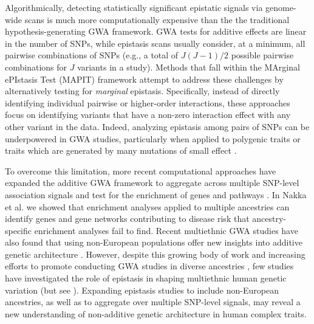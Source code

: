 \documentclass[10pt]{article}
\begin{document}
Algorithmically, detecting statistically significant epistatic signals via genome-wide scans is much more computationally expensive than the the traditional hypothesis-generating GWA framework. GWA tests for additive effects are linear in the number of SNPs, while epistasis scans usually consider, at a minimum, all pairwise combinations of SNPs (e.g., a total of $J(J - 1)/2$ possible pairwise combinations for $J$ variants in a study). Methods that fall within the MArginal ePIstasis Test (MAPIT) framework \cite{Crawford2017a,Crawford2018b,Moore2019,Wang2019} attempt to address these challenges by alternatively testing for \textit{marginal} epistasis. Specifically, instead of directly identifying individual pairwise or higher-order interactions, these approaches focus on identifying variants that have a non-zero interaction effect with any other variant in the data. Indeed, analyzing epistasis among pairs of SNPs can be underpowered in GWA studies, particularly when applied to polygenic traits or traits which are generated by many mutations of small effect \cite{Zhou2013,Yang2014,Bulik-Sullivan2015,Wray2018}. 

To overcome this limitation, more recent computational approaches have expanded the additive GWA framework to aggregate across multiple SNP-level association signals and test for the enrichment of genes and pathways \cite{Subramanian2005,Cantor2010,Wang2010b,Lee2012,Carbonetto2013,Mooney2014,Gamazon2015,de2016,Nakka2016,Zhu2018,Sun2019,Cheng2020}. In Nakka et al. \cite{Nakka2017} we showed that enrichment analyses applied to multiple ancestries can identify genes and gene networks contributing to disease risk that ancestry-specific enrichment analyses fail to find. Recent multiethnic GWA studies have also found that using non-European populations offer new insights into additive genetic architecture \cite{Martin2017b,Crawford2017b,Duncan2019,Kuchenbaecker2019,Zhong2019,Wojcik2019,Chen2020,Marnetto2020}. However, despite this growing body of work and increasing efforts to promote conducting GWA studies in diverse ancestries \cite{Popejoy2016,Martin2018,Martin2019,Gurdasani2019,Sirugo2019,Wojcik2019}, few studies have investigated the role of epistasis in shaping multiethnic human genetic variation (but see \cite{Ma2012,Fish2016,Choquet2018,Hoffmann2018}). Expanding epistasis studies to include non-European ancestries, as well as to aggregate over multiple SNP-level signals, may reveal a new understanding of non-additive genetic architecture in human complex traits. 
\end{document}
